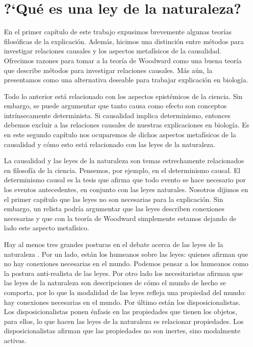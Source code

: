 
\chapter{?`Qué es una ley de la naturaleza?}

\noindent En el primer capítulo de este trabajo expusimos brevemente algunas teorías filosóficas de la explicación. Además, hicimos una distinción entre métodos para investigar relaciones causales y los aspectos metafísicos de la causalidad. Ofrecimos razones para tomar a la teoría de Woodward como una buena teoría que describe métodos para investigar relaciones causales. Más aún, la presentamos como una alternativa deseable para trabajar explicación en biología.

Todo lo anterior está relacionado con los aspectos epistémicos de la ciencia. Sin embargo, se puede argumentar que tanto causa como efecto son conceptos intrínsecamente determinista. Si causalidad implica determinismo, entonces debemos excluir a las relaciones causales de nuestras explicaciones en biología. Es en este segundo capítulo nos ocuparemos de dichos aspectos metafísicos de la causalidad y cómo esto está relacionado con las leyes de la naturaleza.

La causalidad y las leyes de la naturaleza son temas estrechamente relacionados en filosofía de la ciencia. Pensemos, por ejemplo, en el determinismo causal. El determinismo causal es la tesis que afirma que todo evento se hace necesario por los eventos antecedentes, en conjunto con las leyes naturales. Nosotros dijimos en el primer capítulo que las leyes no son necesarias para la explicación. Sin embargo, un relista podría argumentar que las leyes describen conexiones necesarias y que con la teoría de Woodward simplemente estamos dejando de lado este aspecto metafísico.

Hay al menos tres grandes posturas en el debate acerca de las leyes de la naturaleza \cite{Borge2019}. Por un lado, están los humeanos sobre las leyes: quienes afirman que no hay conexiones necesarias en el mundo. Podemos pensar a los humeanos como la postura anti-realista de las leyes. Por otro lado los necesitaristas afirman que las leyes de la naturaleza son descripciones de cómo el mundo de hecho se comporta, por lo que la modalidad de las leyes refleja una propiedad del mundo: hay conexiones necesarias en el mundo. Por último están los disposicionalistas. Los disposicionalistas ponen énfasis en las propiedades que tienen los objetos, para ellos, lo que hacen las leyes de la naturaleza es relacionar propiedades. Los disposicionalistas afirman que las propiedades no son inertes, sino modalmente activas.

